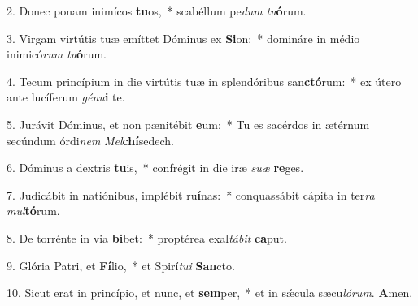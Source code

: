 \item 2. Donec ponam inimícos \textbf{tu}os,~* scabéllum pe\hspace{0.03em}\textit{dum} \textit{tu}\textbf{ó}rum.
\item 3. Virgam virtútis tuæ emíttet Dóminus ex \textbf{Si}on:~* domináre in médio inimicó\textit{rum} \textit{tu}\textbf{ó}rum.
\item 4. Tecum princípium in die virtútis tuæ in splendóribus san\textbf{ctó}rum:~* ex útero ante lucíferum \textit{génu}\textbf{i} te.
\item 5. Jurávit Dóminus, et non pænitébit \textbf{e}um:~* Tu es sacérdos in ætérnum secúndum órdi\textit{nem} \textit{Mel}\textbf{chí}sedech.
\item 6. Dóminus a dextris \textbf{tu}is,~* confrégit in die iræ \textit{suæ} \textbf{re}ges.
\item 7. Judicábit in natiónibus, implébit ru\textbf{í}nas:~* conquassábit cápita in ter\textit{ra} \textit{mul}\textbf{tó}rum.
\item 8. De torrénte in via \textbf{bi}bet:~* proptérea exal\textit{tábit} \textbf{ca}put.
\item 9. Glória Patri, et \textbf{Fí}lio,~* et Spirí\textit{tui} \textbf{San}cto.
\item 10. Sicut erat in princípio, et nunc, et \textbf{sem}per,~* et in sǽcula sæcu\hspace{0.03em}\textit{lórum}. \textbf{A}men.

